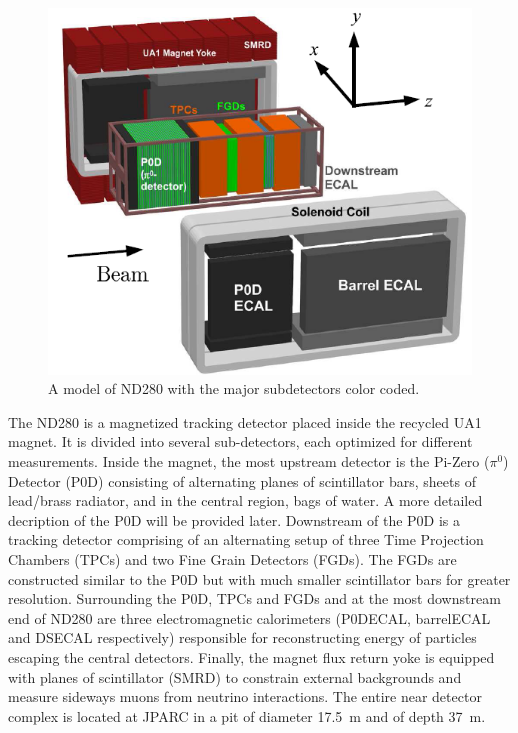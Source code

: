 \begin{figure}
\begin{center}
\includegraphics[width=6in]{./Figures/nd280.png}
\end{center}
\caption{A model of ND280 with the major subdetectors color coded.}
\label{fig:nd280}
\end{figure}

The ND280 is a magnetized tracking detector placed inside the recycled
UA1 magnet. It is divided into several sub-detectors, each optimized
for different measurements. Inside the magnet, the most upstream
detector is the Pi-Zero ($\pi^0$) Detector (P0D) consisting of alternating
planes of scintillator bars, sheets of lead/brass radiator, and in the central
region, bags of water. A more detailed decription of the P0D will be provided later. Downstream of the P0D is a tracking detector
comprising of an alternating setup of three Time Projection Chambers
(TPCs) and two Fine Grain Detectors (FGDs). The FGDs are constructed
similar to the P0D but with much smaller scintillator bars for greater
resolution. Surrounding the P0D, TPCs and FGDs and at the most
downstream end of ND280 are three electromagnetic
calorimeters (P0DECAL, barrelECAL and DSECAL respectively) responsible for reconstructing
energy of particles escaping the central detectors. Finally, the
magnet flux return yoke is equipped with planes of scintillator (SMRD)
to constrain external backgrounds and measure sideways muons from neutrino interactions. The entire near detector complex is
located at JPARC in a pit of diameter 17.5~m and of depth 37~m. 

